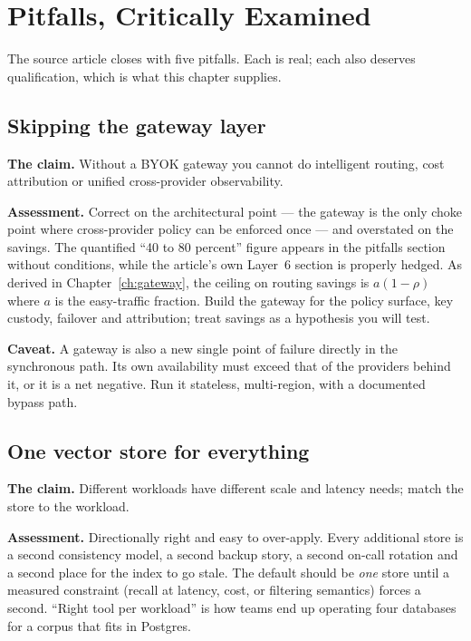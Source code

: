 \documentclass[11pt,twoside,openright]{book}
\theoremstyle{definition}
\theoremstyle{plain}
\theoremstyle{remark}
\begin{document}
\cleardoublepage

\chapter{Pitfalls, Critically Examined}
\label{ch:pitfalls}

The source article closes with five pitfalls. Each is real; each also deserves
qualification, which is what this chapter supplies.

\section{Skipping the gateway layer}

\textbf{The claim.} Without a BYOK gateway you cannot do intelligent routing,
cost attribution or unified cross-provider observability.

\textbf{Assessment.} Correct on the architectural point --- the gateway is the
only choke point where cross-provider policy can be enforced once --- and
overstated on the savings. The quantified ``40 to 80 percent'' figure appears in
the pitfalls section without conditions, while the article's own Layer~6 section
is properly hedged. As derived in Chapter~\ref{ch:gateway}, the ceiling on
routing savings is $a(1-\rho)$ where $a$ is the easy-traffic fraction. Build the
gateway for the policy surface, key custody, failover and attribution; treat
savings as a hypothesis you will test.

\textbf{Caveat.} A gateway is also a new single point of failure directly in the
synchronous path. Its own availability must exceed that of the providers behind
it, or it is a net negative. Run it stateless, multi-region, with a documented
bypass path.

\section{One vector store for everything}

\textbf{The claim.} Different workloads have different scale and latency needs;
match the store to the workload.

\textbf{Assessment.} Directionally right and easy to over-apply. Every additional
store is a second consistency model, a second backup story, a second on-call
rotation and a second place for the index to go stale. The default should be
\emph{one} store until a measured constraint (recall at latency, cost, or
filtering semantics) forces a second. ``Right tool per workload'' is how teams
end up operating four databases for a corpus that fits in Postgres.
\end{document}
